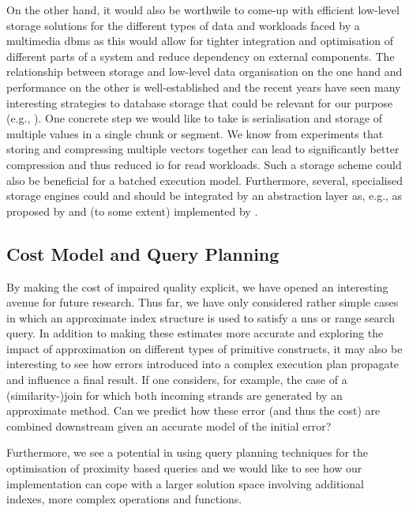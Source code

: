 On the other hand, it would also be worthwile to come-up with efficient low-level storage solutions for the different types of data and workloads faced by a multimedia \acrshort{dbms} as this would allow for tighter integration and optimisation of different parts of a system and reduce dependency on external components. The relationship between storage and low-level data organisation on the one hand and performance on the other is well-established \cite{Lejsek:2009NVTree,Lejsek:2011NVTree,Hojsgaard:2019Index} and the recent years have seen many interesting strategies to database storage that could be relevant for our purpose (e.g., \cite{Idreos:2012MonetDB,Sears:2012Blsm}). One concrete step we would like to take is serialisation and storage of multiple values in a single chunk or segment. We know from experiments that storing and compressing multiple vectors together can lead to significantly better compression and thus reduced \acrshort{io} for read workloads. Such a storage scheme could also be beneficial for a batched execution model. Furthermore, several, specialised storage engines could and should be integrated by an abstraction layer as, e.g., as proposed by \cite{Dittrich:2011Towards,Alagiannis:2014H2O} and (to some extent) implemented by \cottontail{} .

\subsection{Cost Model and Query Planning}
By making the cost of impaired quality explicit, we have opened an interesting avenue for future research. Thus far, we have only considered rather simple cases in which an approximate index structure is used to satisfy a \acrshort{nns} or range search query. In addition to making these estimates more accurate and exploring the impact of approximation on different types of primitive constructs, it may also be interesting to see how errors introduced into a complex execution plan propagate and influence a final result. If one considers, for example, the case of a (similarity-)join for which both incoming strands are generated by an approximate method. Can we predict how these error (and thus the cost) are combined downstream given an accurate model of the initial error?

Furthermore, we see a potential in using query planning techniques for the optimisation of proximity based queries and we would like to see how our implementation can cope with a larger solution space involving additional indexes, more complex operations and functions.

